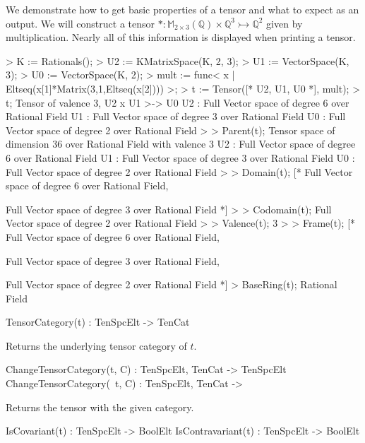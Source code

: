 \begin{example}[BasicProps]

We demonstrate how to get basic properties of a tensor and what to expect as an output.
We will construct a tensor $*:\mathbb{M}_{2\times 3}(\mathbb{Q})\times \mathbb{Q}^3\rightarrowtail \mathbb{Q}^2$ given by multiplication.
Nearly all of this information is displayed when printing a tensor.
\begin{code}
> K := Rationals();
> U2 := KMatrixSpace(K, 2, 3);
> U1 := VectorSpace(K, 3);
> U0 := VectorSpace(K, 2);
> mult := func< x | Eltseq(x[1]*Matrix(3,1,Eltseq(x[2]))) >;
> t := Tensor([* U2, U1, U0 *], mult);
> t;
Tensor of valence 3, U2 x U1 >-> U0
U2 : Full Vector space of degree 6 over Rational Field
U1 : Full Vector space of degree 3 over Rational Field
U0 : Full Vector space of degree 2 over Rational Field
> 
> Parent(t);
Tensor space of dimension 36 over Rational Field with valence 3
U2 : Full Vector space of degree 6 over Rational Field
U1 : Full Vector space of degree 3 over Rational Field
U0 : Full Vector space of degree 2 over Rational Field
> 
> Domain(t);
[*
    Full Vector space of degree 6 over Rational Field,

    Full Vector space of degree 3 over Rational Field
*]
> 
> Codomain(t);
Full Vector space of degree 2 over Rational Field
> 
> Valence(t);
3
> 
> Frame(t);
[*
    Full Vector space of degree 6 over Rational Field,

    Full Vector space of degree 3 over Rational Field,

    Full Vector space of degree 2 over Rational Field
*]
> BaseRing(t);
Rational Field
\end{code}
\end{example}

\begin{intrinsics}
TensorCategory(t) : TenSpcElt -> TenCat
\end{intrinsics}

Returns the underlying tensor category of $t$.

\begin{intrinsics}
ChangeTensorCategory(t, C) : TenSpcElt, TenCat -> TenSpcElt
ChangeTensorCategory(~t, C) : TenSpcElt, TenCat -> 
\end{intrinsics}

Returns the tensor with the given category.

\begin{intrinsics}
IsCovariant(t) : TenSpcElt -> BoolElt
IsContravariant(t) : TenSpcElt -> BoolElt
\end{intrinsics}

